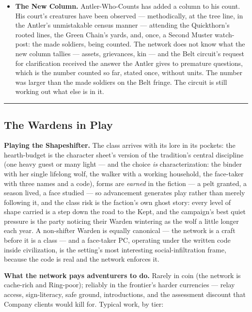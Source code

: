 \begin{itemize}
    \item \textbf{The New Column.} Antler-Who-Counts has added a column to his count. His court's creatures have been observed --- methodically, at the tree line, in the Antler's unmistakable census manner --- attending the Quickthorn's rooted lines, the Green Chain's yards, and, once, a Second Muster watch-post: the made soldiers, being counted. The network does not know what the new column tallies --- assets, grievances, kin --- and the Belt circuit's request for clarification received the answer the Antler gives to premature questions, which is the number counted so far, stated once, without units. The number was larger than the made soldiers on the Belt fringe. The circuit is still working out what else is in it.
\end{itemize}

\medskip\hrule\medskip

\subsection{The Wardens in Play}

\textbf{Playing the Shapeshifter.} The class arrives with its lore in its pockets: the hearth-budget is the character sheet's version of the tradition's central discipline (one heavy guest or many light --- and the choice \textit{is} characterization: the binder with her single lifelong wolf, the walker with a working household, the face-taker with three names and a code), forms are \textit{earned} in the fiction --- a pelt granted, a season lived, a face studied --- so advancement generates play rather than merely following it, and the class risk is the faction's own ghost story: every level of shape carried is a step down the road to the Kept, and the campaign's best quiet pressure is the party noticing their Warden wintering as the wolf a little longer each year. A non-shifter Warden is equally canonical --- the network is a craft before it is a class --- and a face-taker PC, operating under the written code inside civilization, is the setting's most interesting social-infiltration frame, because the code is real and the network enforces it.

\textbf{What the network pays adventurers to do.} Rarely in coin (the network is cache-rich and Ring-poor); reliably in the frontier's harder currencies --- relay access, sign-literacy, safe ground, introductions, and the assessment discount that Company clients would kill for. Typical work, by tier:

